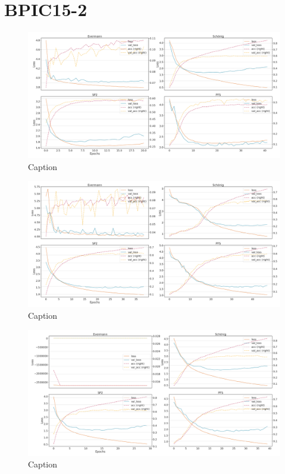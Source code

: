 \section{BPIC15-2}
\begin{figure}[!htb]
    \centering
    \includegraphics[width=\textwidth]{gfx/bpic2015_2/individual_loss_acc_curve.png}
    \caption{Caption}
    \label{fig:my_label}
\end{figure}
\begin{figure}[!htb]
    \centering
    \includegraphics[width=\textwidth]{gfx/bpic2015_2/grouped_loss_acc_curve.png}
    \caption{Caption}
    \label{fig:my_label}
\end{figure}
\begin{figure}[!htb]
    \centering
    \includegraphics[width=\textwidth]{gfx/bpic2015_2/padded_loss_acc_curve.png}
    \caption{Caption}
    \label{fig:my_label}
\end{figure}
